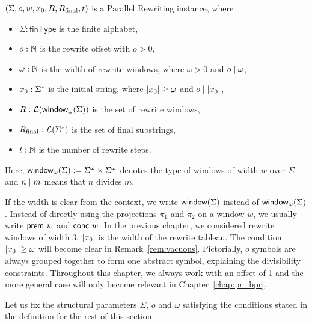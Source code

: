 \begin{definition}\label{def:pr}
  $(\Sigma, o, w, x_0, R, R_{\text{final}}, t)$ is a Parallel Rewriting instance, where 
  \begin{itemize}
    \item $\Sigma : \textsf{finType}$ is the finite alphabet,
    \item $o : \mathbb{N}$ is the rewrite offset with $o > 0$,
    \item $\omega : \mathbb{N}$ is the width of rewrite windows, where $\omega > 0$ and $o \mid \omega$,
    \item $x_0 : \Sigma^*$ is the initial string, where $|x_0| \ge \omega$ and $o \mid |x_0|$,
    \item $R : \mathcal{L} (\textsf{window}_{\omega}{(\Sigma)})$ is the set of rewrite windows,
    \item $R_{\text{final}} : \mathcal{L} (\Sigma^*)$ is the set of final substrings,
    \item $t : \mathbb{N}$ is the number of rewrite steps.
  \end{itemize}
  Here, $\textsf{window}_{\omega}{(\Sigma)} := {\Sigma}^\omega \times {\Sigma}^\omega$\mnote{$\winw{\omega}{\Sigma}$} denotes the type of windows of width $w$ over $\Sigma$ and $ n \mid{} m$ means that $n$ divides $m$.
\end{definition}
If the width is clear from the context, we write $\textsf{window}{(\Sigma)}$ instead of $\winw{\omega}{\Sigma}$.
Instead of directly using the projections $\pi_1$ and $\pi_2$ on a window $w$, we usually write $\textsf{prem}~w$ and $\textsf{conc}~w$. In the previous chapter, we considered rewrite windows of width 3.
$|x_0|$ is the width of the rewrite tableau. The condition $|x_0| \ge \omega$ will become clear in Remark~\ref{rem:vacuous}.
Pictorially, $o$ symbols are always grouped together to form one abstract symbol, explaining the divisibility constraints. Throughout this chapter, we always work with an offset of 1 and the more general case will only become relevant in Chapter~\ref{chap:pr_bpr}.

Let us fix the structural parameters $\Sigma$, $o$ and $\omega$ satisfying the conditions stated in the definition for the rest of this section.

